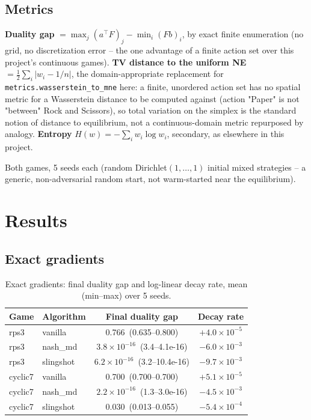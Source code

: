 \documentclass[11pt]{article}
\begin{document}
\subsection{Metrics}
\textbf{Duality gap} $= \max_j (a^\top F)_j - \min_i (Fb)_i$, by exact finite
enumeration (no grid, no discretization error -- the one advantage of a
finite action set over this project's continuous games). \textbf{TV
distance to the uniform NE} $=\tfrac12\sum_i|w_i - 1/n|$, the
domain-appropriate replacement for \texttt{metrics.wasserstein\_to\_mne}
here: a finite, unordered action set has no spatial metric for a
Wasserstein distance to be computed against (action "Paper" is not
"between" Rock and Scissors), so total variation on the simplex is the
standard notion of distance to equilibrium, not a continuous-domain metric
repurposed by analogy. \textbf{Entropy} $H(w)=-\sum_i w_i\log w_i$, secondary,
as elsewhere in this project.

Both games, 5 seeds each (random Dirichlet$(1,\dots,1)$ initial mixed
strategies -- a generic, non-adversarial random start, not warm-started near
the equilibrium).

\section{Results}

\subsection{Exact gradients}
\begin{table}[H]
\centering
\caption{Exact gradients: final duality gap and log-linear decay rate, mean (min--max) over 5 seeds.}
\begin{tabular}{@{}llcc@{}}
\toprule
Game & Algorithm & Final duality gap & Decay rate \\
\midrule
rps3    & vanilla   & 0.766\ (0.635--0.800)              & $+4.0\times10^{-5}$ \\
rps3    & nash\_md  & $3.8\times10^{-16}$\ (3.4--4.1e-16) & $-6.0\times10^{-3}$ \\
rps3    & slingshot & $6.2\times10^{-16}$\ (3.2--10.4e-16)& $-9.7\times10^{-3}$ \\
\addlinespace
cyclic7 & vanilla   & 0.700\ (0.700--0.700)              & $+5.1\times10^{-5}$ \\
cyclic7 & nash\_md  & $2.2\times10^{-16}$\ (1.3--3.0e-16) & $-4.5\times10^{-3}$ \\
cyclic7 & slingshot & 0.030\ (0.013--0.055)              & $-5.4\times10^{-4}$ \\
\bottomrule
\end{tabular}
\end{table}
\end{document}

